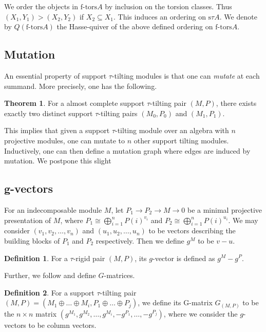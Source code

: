 \documentclass[]{article}
\theoremstyle{definition}
\newtheorem{definition}{Definition}[section]
\newtheorem{theorem}{Theorem}[section]
\newcommand{\tu}{\ensuremath{\tau}}
\begin{document}
We order the objects in $\text{f-tors} A$ by inclusion on the torsion classes. Thus $(X_1,Y_1) > (X_2,Y_2)$ if $X_2 \subseteq X_1$. This induces an ordering on $\text{s}\tu A$. We denote by $Q(\text{f-tors} A)$ the Hasse-quiver of the above defined ordering on $\text{f-tors} A$.

\subsection{Mutation}
An essential property of support \tu-tilting modules is that one can \textit{mutate} at each summand. More precisely, one has the following.

\begin{theorem}
	For a almost complete support $\tau$-tilting pair $(M,P)$, there exists exactly two distinct support \tu-tilting pairs $(M_0,P_0)$ and $(M_1,P_1)$. 
\end{theorem}

This implies that given a support \tu-tilting module over an algebra with $n$ projective modules, one can mutate to $n$ other support tilting modules. Inductively, one can then define a mutation graph where edges are induced by mutation. We postpone this slight

\subsection{g-vectors}
For an indecomposable module $M$, let $P_1 \to P_2 \to M \to 0$ be a minimal projective presentation of $M$, where $P_1 \cong \bigoplus_{i = 1}^n P(i)^{v_i}$ and $P_2 \cong \bigoplus_{i = 1}^n P(i)^{u_i}$. We may consider $(v_1,v_2,\dots,v_n)$ and $(u_1,u_2,\dots,u_n)$ to be vectors describing the building blocks of $P_1$ and $P_2$ respectively. Then we define $g^M$ to be $v - u$. 

\begin{definition}
	For a $\tau$-rigid pair $(M,P)$, its $g$-vector is defined as $g^M - g^P$. 
\end{definition}

Further, we follow \cite{schroll2020tautilting} and define $G$-matrices.

\begin{definition}\cite[Definition 2.4]{schroll2020tautilting}
	For a support \tu-tilting pair $(M,P) = (M_1 \oplus \dots \oplus M_i,P_1 \oplus \dots \oplus P_j)$, we define its G-matrix $G_{(M,P)}$ to be the $n \times n$ matrix $(g^{M_1},g^{M_2},\dots,g^{M_i},-g^{P_1},\dots,-g^{P_j})$, where we consider the $g$-vectors to be column vectors.
	
\end{definition} 
\end{document}
